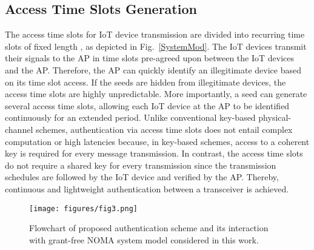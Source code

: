 \documentclass[journal,10pt]{IEEEtran}
\begin{document}
\subsection{Access Time Slots Generation}
The access time slots for IoT device transmission are divided into recurring time slots of fixed length \cite{9378574}, as depicted in Fig.~\ref{SystemMod}. The IoT devices transmit their signals to the AP in time slots pre-agreed upon between the IoT devices and the AP. Therefore, the AP can quickly identify an illegitimate device based on its time slot access. If the seeds are hidden from illegitimate devices, the access time slots are highly unpredictable. More importantly, a seed can generate several access time slots, allowing each IoT device at the AP to be identified continuously for an extended period. Unlike conventional key-based physical-channel schemes, authentication via access time slots does not entail complex computation or high latencies because, in key-based schemes, access to a coherent key is required for every message transmission. In contrast, the access time slots do not require a shared key for every transmission since the transmission schedules are followed by the IoT device and verified by the AP. Thereby, continuous and lightweight authentication between a transceiver is achieved.

\begin{figure*}[t]
\centering
\texttt{[image: figures/fig3.png]} 
\caption{Flowchart of proposed authentication scheme and its interaction with grant-free NOMA system model considered in this work.}
\label{framework}
\end{figure*}
\end{document}
